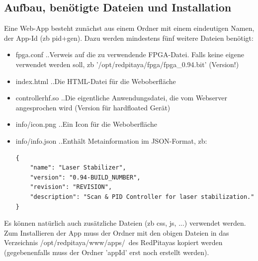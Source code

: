 \documentclass[11pt]{scrartcl}
\begin{document}
\subsection{Aufbau, benötigte Dateien und Installation}
Eine Web-App besteht zunächst aus einem Ordner mit einem eindeutigen Namen, der App-Id (zb \grqq pid+gen\grqq ). Dazu werden mindestens fünf weitere Dateien benötigt:
\begin{itemize} 
\item fpga.conf ..Verweis auf die zu verwendende FPGA-Datei. Falls keine eigene verwendet werden soll, zb '/opt/redpitaya/fpga/fpga\_0.94.bit' (Version!)
\item index.html ..Die HTML-Datei für die Weboberfläche
\item controllerhf.so ..Die eigentliche Anwendungsdatei, die vom Webserver angesprochen wird (Version für hardfloated Gerät)
\item info/icon.png ..Ein Icon für die Weboberfläche
\item info/info.json ..Enthält Metainformation im JSON-Format, zb:
\begin{lstlisting}
{
    "name": "Laser Stabilizer",
    "version": "0.94-BUILD_NUMBER",
    "revision": "REVISION",
    "description": "Scan & PID Controller for laser stabilization."
}
\end{lstlisting}
\end{itemize}
Es können natürlich auch zusätzliche Dateien (zb css, js, ...) verwendet werden.\\
Zum Installieren der App muss der Ordner mit den obigen Dateien in das Verzeichnis \grqq /opt/redpitaya/www/apps/\grqq~des RedPitayas kopiert werden (gegebenenfalls muss der Ordner 'appId' erst noch erstellt werden).
\end{document}

